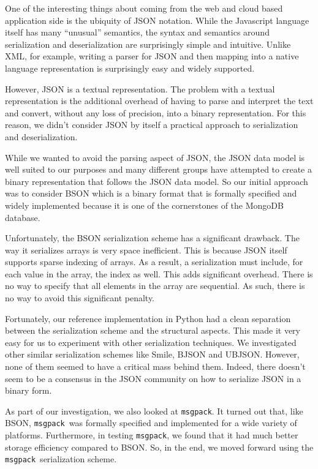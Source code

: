 \documentclass[11pt,a4paper,twocolumn]{article}
\newcommand{\msgpack}{\texttt{msgpack}}
\begin{document}
One of the interesting things about coming from the web and cloud
based application side is the ubiquity of JSON notation.  While the
Javascript language itself has many ``unusual'' semantics, the syntax
and semantics around serialization and deserialization are
surprisingly simple and intuitive.  Unlike XML, for example, writing a
parser for JSON and then mapping into a native language representation
is surprisingly easy and widely supported.

However, JSON is a textual representation.  The problem with a textual
representation is the additional overhead of having to parse and
interpret the text and convert, without any loss of precision, into a
binary representation.  For this reason, we didn't consider JSON by
itself a practical approach to serialization and deserialization.

While we wanted to avoid the parsing aspect of JSON, the JSON data
model\cite{JSON} is well suited to our purposes and many different
groups have attempted to create a binary representation that follows
the JSON data model.  So our initial approach was to consider BSON
\cite{BSON} which is a binary format that is formally specified and
widely implemented because it is one of the cornerstones of the
MongoDB database\cite{MongoDB}.

Unfortunately, the BSON serialization scheme has a significant
drawback.  The way it serializes arrays is very space inefficient.
This is because JSON itself supports sparse indexing of arrays.  As a
result, a serialization must include, for each value in the array, the
index as well.  This adds significant overhead.  There is no way to
specify that all elements in the array are sequential.  As such, there
is no way to avoid this significant penalty.

Fortunately, our reference implementation in Python\cite{pyRecon} had
a clean separation between the serialization scheme and the structural
aspects.  This made it very easy for us to experiment with other
serialization techniques.  We investigated other similar serialization
schemes like Smile\cite{Smile}, BJSON\cite{BJSON} and
UBJSON\cite{UBJSON}.  However, none of them seemed to have a critical
mass behind them.  Indeed, there doesn't seem to be a consensus in the
JSON community on how to serialize JSON in a binary form.

As part of our investigation, we also looked at \msgpack.  It turned
out that, like BSON, \msgpack\ was formally specified and implemented
for a wide variety of platforms\cite{msgpack}.  Furthermore, in
testing \msgpack, we found that it had much better storage efficiency
compared to BSON.  So, in the end, we moved forward using the
\msgpack\ serialization scheme.
\end{document}

